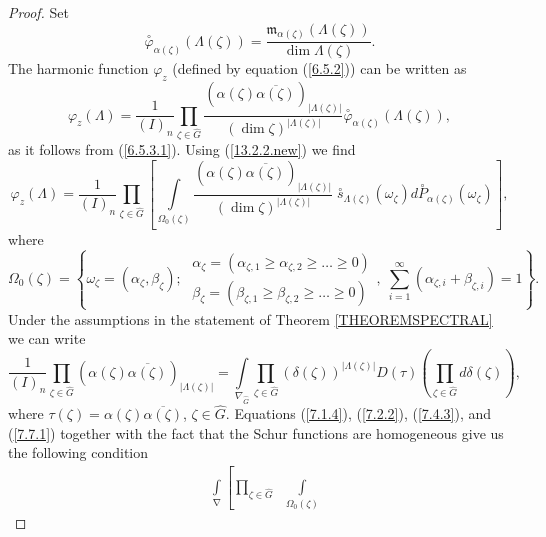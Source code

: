 \documentclass[12pt]{amsart}
\theoremstyle{definition}
\numberwithin{equation}{section}
\begin{document}
\begin{proof}
Set
$$
\overset{\circ}{\varphi}_{\alpha(\zeta)}(\Lambda(\zeta))=\frac{\mathfrak{m}_{\alpha(\zeta)}(\Lambda(\zeta))}{\dim\Lambda(\zeta)}.
$$
The harmonic function $\varphi_z$ (defined by equation (\ref{6.5.2})) can be written as
\begin{equation}
\varphi_z(\Lambda)=\frac{1}{(I)_n}
\prod\limits_{\zeta\in\widehat{G}}
\frac{(\alpha(\zeta)\overline{\alpha(\zeta)})_{|\Lambda(\zeta)|}}{(\dim\zeta)^{|\Lambda(\zeta)|}}
\overset{\circ}{\varphi}_{\alpha(\zeta)}(\Lambda(\zeta)),
\end{equation}
as it follows from (\ref{6.5.3.1}). Using (\ref{13.2.2.new}) we find
\begin{equation}\label{7.4.3}
\varphi_z(\Lambda)=
\frac{1}{(I)_n}
\prod\limits_{\zeta\in\widehat{G}}\left[\int\limits_{\Omega_0(\zeta)}
\frac{(\alpha(\zeta)\overline{\alpha(\zeta)})_{|\Lambda(\zeta)|}}{(\dim\zeta)^{|\Lambda(\zeta)|}}
\;\overset{\circ}{s}_{\Lambda(\zeta)}(\omega_{\zeta})d\overset{\circ}{P}_{\alpha(\zeta)}(\omega_{\zeta})\right],
\end{equation}
where
\begin{equation}
\Omega_{0}(\zeta)=\left\{\omega_{\zeta}=(\alpha_{\zeta},\beta_{\zeta});\;
\begin{array}{c}
  \alpha_{\zeta}=(\alpha_{\zeta,1}\geq\alpha_{\zeta,2}\geq\ldots\geq 0) \\
  \beta_{\zeta}=(\beta_{\zeta,1}\geq\beta_{\zeta,2}\geq\ldots\geq 0)
\end{array},
\;
\sum\limits_{i=1}^{\infty}(\alpha_{\zeta,i}+\beta_{\zeta,i})=1\right\}.
\nonumber
\end{equation}
Under the assumptions in the statement of Theorem \ref{THEOREMSPECTRAL} we can write
\begin{equation}\label{7.7.1}
\frac{1}{(I)_n}
\prod\limits_{\zeta\in\widehat{G}}
(\alpha(\zeta)\overline{\alpha(\zeta)})_{|\Lambda(\zeta)|}
=\underset{\nabla_{\widehat{G}}}{\int}\prod\limits_{\zeta\in\widehat{G}}\left(\delta(\zeta)\right)^{|\Lambda(\zeta)|}
D(\tau)\left(\prod\limits_{\zeta\in\widehat{G}}d\delta(\zeta)\right),
\end{equation}
where $\tau(\zeta)=\alpha(\zeta)\overline{\alpha(\zeta)}$, $\zeta\in\widehat{G}$. Equations (\ref{7.1.4}), (\ref{7.2.2}), (\ref{7.4.3}), and (\ref{7.7.1}) together with the fact that the Schur functions  are homogeneous give us the following condition
\begin{equation}\label{7.8.1}
\begin{split}
&\int\limits_{\nabla}\left[\prod\limits_{\zeta\in\widehat{G}}\;\;\int\limits_{\Omega_0(\zeta)}

\end{split}
\end{equation}
\end{proof}
\end{document}
